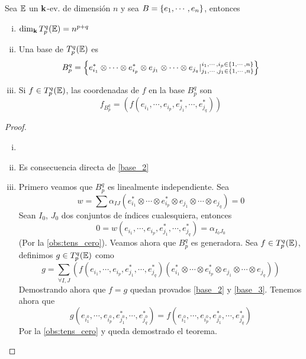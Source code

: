 \begin{teo}[(base de $T_p^q(\E)$)]
	Sea $\mathbb{E}$ un $\mathbf{k}$-ev. de dimensión $n$ y sea $B = \left\{e_1, \cdots, e_n\right\}$,
	entonces
\begin{enumerate}[i)]
		\item $\dim_{\mathbf{k}} T_p^q(\mathbb{E}) = n^{p+q}$
		\item \label{base_2} Una base de $T_p^q(\E)$ es
		\[
			B_p^q = \left\{ e_{i_1}^* \otimes \cdots \otimes e_{i_p}^* \otimes
			e_{j_1} \otimes \cdots \otimes e_{j_q} \vert
			\substack{i_1, \cdots, i_p \in \left\{1,\cdots,n\right\} \\
				j_1, \cdots, j_1 \in \left\{1,\cdots,n\right\}} \right\}
		\]
		\item \label{base_3} Si $f \in T_p^q(\mathbb{E})$, las coordenadas de $f$ en la base $B_p^q$ son
		\[
			f_{B_p^q} = (f(e_{i_1}, \cdots, e_{i_p}, e_{j_1}^*, \cdots, e_{j_q}^*))
		\]
	\end{enumerate}
\end{teo}
\begin{proof}
	\begin{enumerate}[i)]
		\item[]
		\item Es consecuencia directa de \ref{base_2}
		\item Primero veamos que $B_p^q$ es linealmente independiente. Sea
		\[
			w = \sum \alpha_{IJ}(e_{i_1}^* \otimes \cdots \otimes e_{i_p}^*
			\otimes e_{j_1} \otimes \cdots \otimes e_{j_q}) = 0
		\]
		Sean $I_0$, $J_0$ dos conjuntos de índices cualesquiera, entonces
		\[
			0 = w(e_{i_1}, \cdots, e_{i_p}, e_{j_1}^*, \cdots, e_{j_q}^*)
			= \alpha_{I_0J_0}
		\]
		(Por la \ref{obs:tens_cero}). Veamos ahora que $B_p^q$
		es generadora. Sea $f \in T_p^q(\mathbb{E})$, definimos $g \in T_p^q(\mathbb{E})$ como
		\[
			g = \sum_{\forall I,J} (f(e_{i_1}, \cdots, e_{i_p}, e_{j_1}^*, \cdots,
			e_{j_q}^*)(e_{i_1}^* \otimes \cdots \otimes e_{i_p}^* \otimes e_{j_1}
			\otimes \cdots \otimes e_{j_q}))
		\]
		Demostrando ahora que $f=g$ quedan provados \ref{base_2} y \ref{base_3}.
		Tenemos ahora que
		\[
			g(e_{i_1^0}, \cdots, e_{i_p^0}, e_{j_1^0}^*, \cdots, e_{j_q^0}^*) =
			f(e_{i_1^0}, \cdots, e_{i_p^0}, e_{j_1^0}^*, \cdots, e_{j_q^0}^*)
		\]
		Por la \ref{obs:tens_cero} y queda demostrado el teorema.
	\end{enumerate}
\end{proof}
